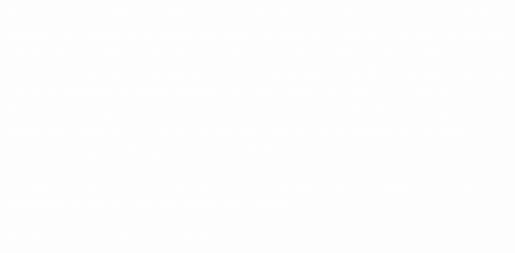 \documentclass[12pt, crop,varwidth,border=3pt,convert={density=300,outext=.png}]{standalone}
\begin{document}
\textcolor{white}{Na samym początku prosilibyśmy Cię o wyobrażenie sobie wyniku rzutu zwykłą monetą, dla której prawdopodobieństwo wyrzucenia zarówno orła jak i reszki jest równe. Za moment na ekranie komputera zacznie wyświetlać się czerwony kwadrat. Za każdym razem gdy się wyświetli prosilibyśmy Cię o~podjęcie decyzji czy w wyobrażonym rzucie monetą wypadła reszka czy orzeł. Naciśnij na klawiaturze O, jeśli był to orzeł albo R jeśli była to reszka. Przez następne 10 minut prosilibyśmy Cię, żebyś za każdym razem gdy wyświetli się czerwony kwadrat podjął tę decyzję i nacisnął odpowiedni klawisz.}
\newline

\textcolor{white}{Usiądź teraz sobie w wygodnej pozycji oraz połóż palce wskazujący i~środkowy dominującej ręki na odpowiednich przyciskach.}

\begin{center}
\textcolor{white}{\Large Naciśnij spację, żeby przejść dalej.}
\end{center}
\end{document}
